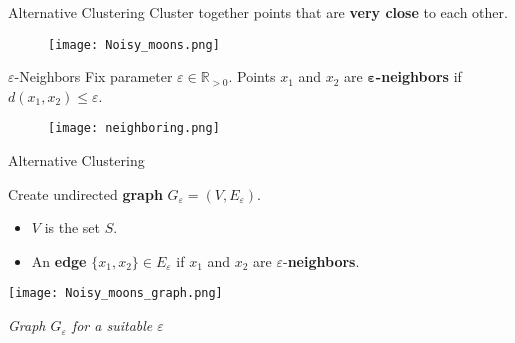 \documentclass[aspectratio=169]{beamer}
\renewcommand{\epsilon}{\varepsilon}
\begin{document}
\begin{comment}
\begin{frame}{$k$-Means Clustering Problems}

    But wait, how do we cluster these sets? Clearly the previously cited algorithms perform badly.
    
\end{frame}


\end{comment}

\begin{frame}{Alternative Clustering}
    \centering Cluster together points that are \textbf{very close} to each other.

\vspace{0.3cm}

    \begin{figure}
        \centering
        \texttt{[image: Noisy\_moons.png]}
    \end{figure}
   
\end{frame}

\begin{frame}{$\epsilon$-Neighbors}
   \centering Fix parameter $\epsilon\in\mathbb{R}_{>0}$. Points $x_1$ and $x_2$ are \textbf{$\mathbf{\epsilon}$-neighbors} if $d(x_1, x_2) \le \epsilon$.

\vspace{0.5cm}
    
    \begin{figure}
        \centering
        \texttt{[image: neighboring.png]}
    \end{figure}
    
\end{frame}

\begin{frame}{Alternative Clustering}

\begin{minipage}[c]{0.50\textwidth}
    Create undirected \textbf{graph} $G_\epsilon = (V,E_\epsilon)$.
    \begin{itemize}
        \item $V$ is the set $S$.
        \item An \textbf{edge} $\{x_1,x_2\}\in E_\epsilon$ if $x_1$ and $x_2$ are $\epsilon$-\textbf{neighbors}.
    \end{itemize}
\end{minipage}
\begin{minipage}[c]{0.05\textwidth}
    
\end{minipage}
\begin{minipage}[c]{0.45\textwidth}
    \begin{center}
        \texttt{[image: Noisy\_moons\_graph.png]}
        
         \textit{Graph $G_\epsilon$ for a suitable $\epsilon$}
        \end{center}
\end{minipage}
    
\end{frame}
\end{document}
